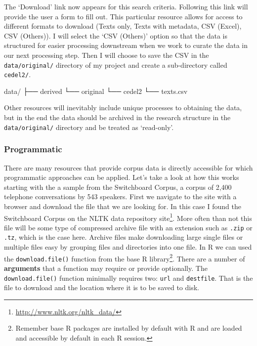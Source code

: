 \documentclass[
]{article}
\newenvironment{Shaded}{\begin{snugshade}}{\end{snugshade}}
\newcommand{\ExtensionTok}[1]{#1}
\newcommand{\NormalTok}[1]{#1}
\DeclareRobustCommand{\href}[2]{#2\footnote{\url{#1}}}
\begin{document}
The `Download' link now appears for this search criteria. Following this link will provide the user a form to fill out. This particular resource allows for access to different formats to download (Texts only, Texts with metadata, CSV (Excel), CSV (Others)). I will select the `CSV (Others)' option so that the data is structured for easier processing downstream when we work to curate the data in our next processing step. Then I will choose to save the CSV in the \texttt{data/original/} directory of my project and create a sub-directory called \texttt{cedel2/}.

\begin{Shaded}
\begin{Highlighting}[]
\ExtensionTok{data/}
\ExtensionTok{├──}\NormalTok{ derived}
\ExtensionTok{└──}\NormalTok{ original}
    \ExtensionTok{└──}\NormalTok{ cedel2}
       \ExtensionTok{└──}\NormalTok{ texts.csv}
\end{Highlighting}
\end{Shaded}

Other resources will inevitably include unique processes to obtaining the data, but in the end the data should be archived in the research structure in the \texttt{data/original/} directory and be treated as `read-only'.

\hypertarget{programmatic}{%
\subsubsection{Programmatic}\label{programmatic}}

There are many resources that provide corpus data is directly accessible for which programmatic approaches can be applied. Let's take a look at how this works starting with the a sample from the Switchboard Corpus, a corpus of 2,400 telephone conversations by 543 speakers. First we navigate to the site with a browser and download the file that we are looking for. In this case I found the Switchboard Corpus on the \href{http://www.nltk.org/nltk_data/}{NLTK data repository site}. More often than not this file will be some type of compressed archive file with an extension such as \texttt{.zip} or \texttt{.tz}, which is the case here. Archive files make downloading large single files or multiple files easy by grouping files and directories into one file. In R we can used the \texttt{download.file()} function from the base R library\footnote{Remember base R packages are installed by default with R and are loaded and accessible by default in each R session.}. There are a number of \textbf{arguments} that a function may require or provide optionally. The \texttt{download.file()} function minimally requires two: \texttt{url} and \texttt{destfile}. That is the file to download and the location where it is to be saved to disk.
\end{document}
